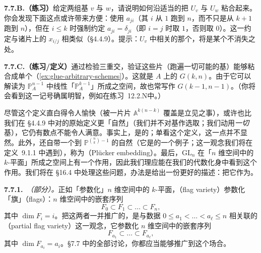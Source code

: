 \textbf{7.7.B.（练习）}\quad 给定两组基 $v$ 与 $w$，请说明如何沿适当的\trOpenSet{}把 $U_v$ 与 $U_w$ 粘合起来。你会发现下面这点或许带来方便：使用\trCoordinate{} $a_{ji}$（其 $i$ 从 $1$ 跑到 $n$，而不只是从 $k+1$ 跑到 $n$），但在 $i\le k$ 时强制约定 $a_{ji}=\delta_{ji}$（即 $i=j$ 时取 $1$，否则取 $0$）。这一约定与\trProjectiveSpace{}诸片上的\trCoordinate{} $x_{i/j}$ 相类似（\S4.4.9）。提示：$U_v$ 中相关的那个\trOpenSubset，将是某个\trDeterminant{}不消失之处。

\textbf{7.7.C.（练习/定义）}\quad 通过检验三重交，验证这些片（跑遍一切可能的基）能够粘合成单个\trScheme（\cref{ex:glue-arbitrary-schemes}）。这就是\trRing{} $A$ 上的\textbf{\trGrassmannian} $G(k,n)$。由于它可以解读为 $\mathbb{P}^{n-1}_A$ 中线性「$\mathbb{P}^{k-1}_A$」所成之空间，故也常写作 $G(k-1,n-1)$。（你将会看到这一记号确属明智，例如在\mbox{练习~12.2.N}中。）

尽管这个定义直白得令人愉快（\trGrassmannian{}被一片片 $\mathbb{A}^{k(n-k)}$ 覆盖是立见之事），或许也比我们在 \S4.4.9 中对\trProjectiveSpace{}的原始定义更「自然」（我们并不对基作选取；我们动用\emph{一切}基），它仍有数点不能令人满意。事实上，\trGrassmannian{}是\trProjective{}的；单看这个定义，这一点并不显然。此外，\trGrassmannian{}还自带一个到 $\mathbb{P}^{\binom{n}{k}-1}$ 的自然\trMorphism（它是\trClosedEmbedding{}的一个例子；这一观念我们将在定义~9.1.1 中遇到），称为\trPluckerEmbedding{}（Plücker embedding）。最后，$\mathrm{GL}_n$ 在「$n$ 维空间中的 $k$-平面」所成之空间上有一个作用，因此我们理应能在我们的代数化身中看到这个作用。我们将在 \S16.4 中处理这些问题，办法是给出一份更好的描述：把它作为\trModuliSpace{}。

\textbf{7.7.1.}\ \emph{（部分）\trFlagVariety{}。}\quad 正如\trGrassmannian{}「参数化」$n$ 维空间中的 $k$-平面，\textbf{\trFlagVariety{}}（flag variety）参数化「旗」（flags）：$n$ 维空间中\trSubspace{}的嵌套序列
\[
F_0\subset F_1\subset\dots\subset F_n,
\]
其中 $\dim F_i=i$。把这两者一并推广的，是与数据 $0\le a_1<\dots<a_\ell\le n$ 相关联的\textbf{\trPartialFlagVariety{}}（partial flag variety）这一观念，它参数化 $n$ 维空间中\trSubspace{}的嵌套序列
\[
F_{a_1}\subset\dots\subset F_{a_\ell},
\]
其中 $\dim F_{a_i}=a_i$。\S7.7 中的全部讨论，你都应当能够推广到这个场合。
